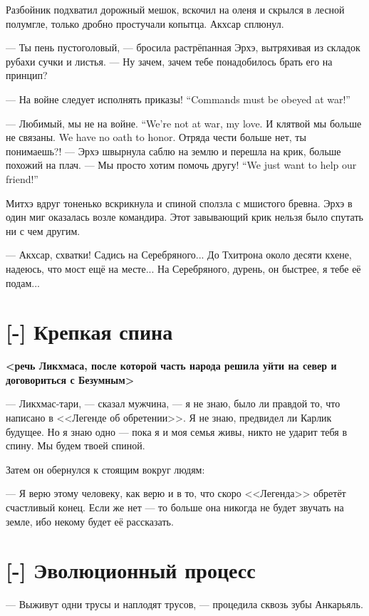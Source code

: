Разбойник подхватил дорожный мешок, вскочил на оленя и скрылся в лесной полумгле, только дробно простучали копытца.
Акхсар сплюнул.

--- Ты пень пустоголовый, --- бросила растрёпанная Эрхэ, вытряхивая из складок рубахи сучки и листья.
--- Ну зачем, зачем тебе понадобилось брать его на принцип?

{--- На войне следует исполнять приказы!}
{``Commands must be obeyed at war!''}

{--- Любимый, мы не на войне.}
{``We're not at war, my love.}
{И клятвой мы больше не связаны.}
{We have no oath to honor.}
Отряда чести больше нет, ты понимаешь?! --- Эрхэ швырнула саблю на землю и перешла на крик, больше похожий на плач.
{--- Мы просто хотим помочь другу!}
{``We just want to help our friend!''}

Митхэ вдруг тоненько вскрикнула и спиной сползла с мшистого бревна.
Эрхэ в один миг оказалась возле командира.
Этот завывающий крик нельзя было спутать ни с чем другим.

--- Акхсар, схватки!
Садись на Серебряного...
До Тхитрона около десяти кхене, надеюсь, что мост ещё на месте...
На Серебряного, дурень, он быстрее, я тебе её подам...

\section{[-] Крепкая спина}

\textbf{<речь Ликхмаса, после которой часть народа решила уйти на север и договориться с Безумным>}

--- Ликхмас-тари, --- сказал мужчина, --- я не знаю, было ли правдой то, что написано в <<Легенде об обретении>>.
Я не знаю, предвидел ли Карлик будущее.
Но я знаю одно --- пока я и моя семья живы, никто не ударит тебя в спину.
Мы будем твоей спиной.

Затем он обернулся к стоящим вокруг людям:

--- Я верю этому человеку, как верю и в то, что скоро <<Легенда>> обретёт счастливый конец.
Если же нет --- то больше она никогда не будет звучать на земле, ибо некому будет её рассказать.

\section{[-] Эволюционный процесс}

\textspace

--- Выживут одни трусы и наплодят трусов, --- процедила сквозь зубы Анкарьяль.

